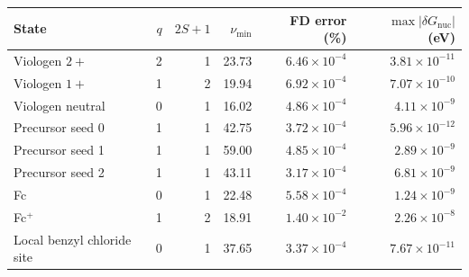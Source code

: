 \begin{tabular}{lrrrrr}\toprule
State & $q$ & $2S+1$ & $\nu_{\min}$ & FD error (\%) & $\max|\delta G_{\mathrm{nuc}}|$ (eV)\\\midrule
Viologen $2+$ & 2 & 1 & 23.73 & $6.46\times10^{-4}$ & $3.81\times10^{-11}$\\
Viologen $1+$ & 1 & 2 & 19.94 & $6.92\times10^{-4}$ & $7.07\times10^{-10}$\\
Viologen neutral & 0 & 1 & 16.02 & $4.86\times10^{-4}$ & $4.11\times10^{-9}$\\
Precursor seed 0 & 1 & 1 & 42.75 & $3.72\times10^{-4}$ & $5.96\times10^{-12}$\\
Precursor seed 1 & 1 & 1 & 59.00 & $4.85\times10^{-4}$ & $2.89\times10^{-9}$\\
Precursor seed 2 & 1 & 1 & 43.11 & $3.17\times10^{-4}$ & $6.81\times10^{-9}$\\
Fc & 0 & 1 & 22.48 & $5.58\times10^{-4}$ & $1.24\times10^{-9}$\\
Fc$^+$ & 1 & 2 & 18.91 & $1.40\times10^{-2}$ & $2.26\times10^{-8}$\\
Local benzyl chloride site & 0 & 1 & 37.65 & $3.37\times10^{-4}$ & $7.67\times10^{-11}$\\
\bottomrule\end{tabular}
